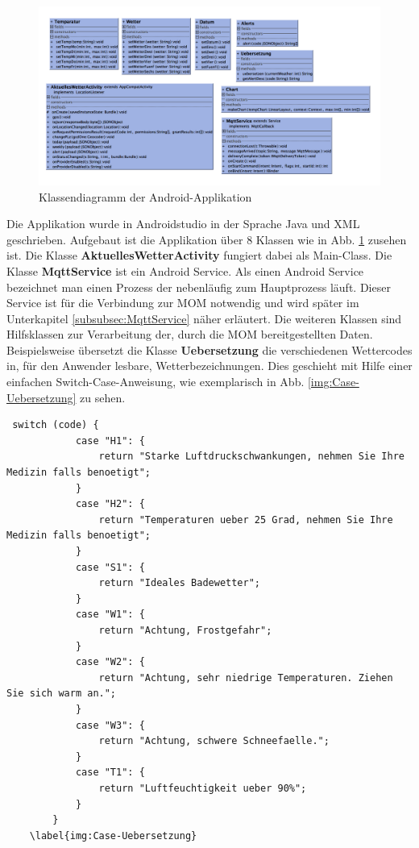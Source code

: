 \begin{figure}[htbp]
	\centering
	\includegraphics[width=1.0\textwidth]{Bilder/AndroidUML.png}
	\caption{Klassendiagramm der Android-Applikation}
	\label{img:AndroidUMLDiagramm}
\end{figure} 
Die Applikation wurde in Androidstudio in der Sprache Java und XML geschrieben. 
Aufgebaut ist die Applikation über 8 Klassen wie in  Abb. \ref{img:AndroidUMLDiagramm} zusehen ist. Die Klasse \textbf{AktuellesWetterActivity} fungiert dabei als Main-Class.
Die Klasse \textbf{MqttService} ist ein Android Service. Als einen Android Service bezeichnet man einen Prozess der nebenläufig zum Hauptprozess läuft. Dieser Service ist für die Verbindung zur MOM notwendig und wird später im Unterkapitel \ref{subsubsec:MqttService} näher erläutert.
Die weiteren Klassen sind Hilfsklassen zur Verarbeitung der, durch die MOM bereitgestellten Daten.
Beispielsweise übersetzt die Klasse \textbf{Uebersetzung} die verschiedenen Wettercodes in, für den Anwender lesbare, Wetterbezeichnungen. Dies geschieht mit Hilfe einer einfachen Switch-Case-Anweisung, wie exemplarisch in Abb. \ref{img:Case-Uebersetzung} zu sehen.
  \begin{lstlisting}
 switch (code) {
            case "H1": {
                return "Starke Luftdruckschwankungen, nehmen Sie Ihre Medizin falls benoetigt";
            }
            case "H2": {
                return "Temperaturen ueber 25 Grad, nehmen Sie Ihre Medizin falls benoetigt";
            }
            case "S1": {
                return "Ideales Badewetter";
            }
            case "W1": {
                return "Achtung, Frostgefahr";
            }
            case "W2": {
                return "Achtung, sehr niedrige Temperaturen. Ziehen Sie sich warm an.";
            }
            case "W3": {
                return "Achtung, schwere Schneefaelle.";
            }
            case "T1": {
                return "Luftfeuchtigkeit ueber 90%";
            }
        }
	\label{img:Case-Uebersetzung}
\end{lstlisting} 

